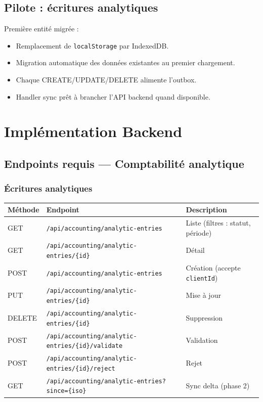 \documentclass[12pt,a4paper]{report}
\begin{document}
\section{Pilote : écritures analytiques}

Première entité migrée :
\begin{itemize}
  \item Remplacement de \texttt{localStorage} par IndexedDB.
  \item Migration automatique des données existantes au premier chargement.
  \item Chaque CREATE/UPDATE/DELETE alimente l'outbox.
  \item Handler sync prêt à brancher l'API backend quand disponible.
\end{itemize}

\chapter{Implémentation Backend}

\section{Endpoints requis — Comptabilité analytique}

\subsection{Écritures analytiques}

\begin{longtable}{@{}p{2cm}p{5.5cm}p{5cm}@{}}
\hline
\textbf{Méthode} & \textbf{Endpoint} & \textbf{Description} \\
\hline

GET & \texttt{/api/accounting/analytic-entries} & Liste (filtres : statut, période) \\
GET & \texttt{/api/accounting/analytic-entries/\{id\}} & Détail \\
POST & \texttt{/api/accounting/analytic-entries} & Création (accepte \texttt{clientId}) \\
PUT & \texttt{/api/accounting/analytic-entries/\{id\}} & Mise à jour \\
DELETE & \texttt{/api/accounting/analytic-entries/\{id\}} & Suppression \\
POST & \texttt{/api/accounting/analytic-entries/\{id\}/validate} & Validation \\
POST & \texttt{/api/accounting/analytic-entries/\{id\}/reject} & Rejet \\
GET & \texttt{/api/accounting/analytic-entries?since=\{iso\}} & Sync delta (phase 2) \\
\hline
\end{longtable}
\end{document}
